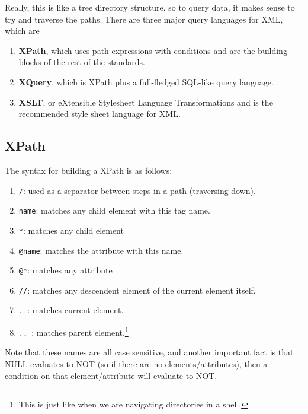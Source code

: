   Really, this is like a tree directory structure, so to query data, it makes sense to try and traverse the paths. There are three major query languages for XML, which are 
  \begin{enumerate}
    \item \textbf{XPath}, which uses path expressions with conditions and are the building blocks of the rest of the standards. 
    \item \textbf{XQuery}, which is XPath plus a full-fledged SQL-like query language. 
    \item \textbf{XSLT}, or eXtensible Stylesheet Language Transformations and is the recommended style sheet language for XML. 
  \end{enumerate}

\subsection{XPath}

  \begin{definition}
    The syntax for building a XPath is as follows: 
    \begin{enumerate}
      \item \texttt{/}: used as a separator between steps in a path (traversing down). 
      \item \texttt{name}: matches any child element with this tag name. 
      \item \texttt{*}: matches any child element 
      \item \texttt{@name}: matches the attribute with this name. 
      \item \texttt{@*}: matches any attribute 
      \item \texttt{//}: matches any descendent element of the current element itself. 
      \item \texttt{. }: matches current element.
      \item \texttt{.. }: matches parent element.\footnote{This is just like when we are navigating directories in a shell.}
    \end{enumerate}
    Note that these names are all case sensitive, and another important fact is that NULL evaluates to NOT (so if there are no elements/attributes), then a condition on that element/attribute will evaluate to NOT. 
  \end{definition}

